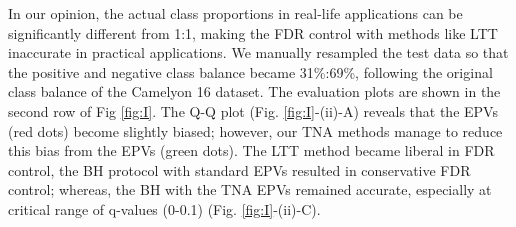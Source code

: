 \documentclass[10pt,letterpaper]{article}
\begin{document}
In our opinion, the actual class proportions in real-life applications can be significantly different from 1:1, making the FDR control with methods like LTT inaccurate in practical applications.
We manually resampled the test data so that  the positive and negative class balance became 31\%:69\%, following the original class balance of the Camelyon 16 dataset.
The evaluation plots are shown in the second row of Fig \ref{fig:I}.
The Q-Q plot (Fig. \ref{fig:I}-(ii)-A) reveals that the EPVs (red dots) become slightly biased; however, our TNA methods manage to reduce this bias from the EPVs (green dots).
The LTT method became liberal in FDR control, the BH protocol with standard EPVs resulted in conservative FDR control; whereas, the BH with the TNA EPVs remained accurate, especially at critical range of q-values (0-0.1) (Fig. \ref{fig:I}-(ii)-C).
\end{document}
